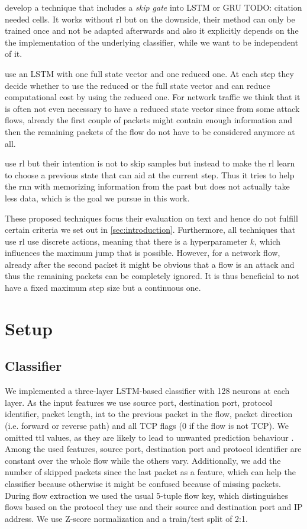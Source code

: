 \documentclass[conference]{IEEEtran}
\newcommand\note[2]{{\color{#1}#2}}
\newcommand\todo[1]{{\note{red}{TODO: #1}}}
\begin{document}
\cite{campos_skip_2018} develop a technique that includes a \textit{skip gate} into LSTM or GRU \todo{citation needed} cells. It works without \gls{rl} but on the downside, their method can only be trained once and not be adapted afterwards and also it explicitly depends on the the implementation of the underlying classifier, while we want to be independent of it. 

\cite{seo_neural_2018} use an LSTM with one full state vector and one reduced one. At each step they decide whether to use the reduced or the full state vector and can reduce computational cost by using the reduced one. For network traffic we think that it is often not even necessary to have a reduced state vector since from some attack flows, already the first couple of packets might contain enough information and then the remaining packets of the flow do not have to be considered anymore at all. 

\cite{gui_long_2018} use \gls{rl} but their intention is not to skip samples but instead to make the \gls{rl} learn to choose a previous state that can aid at the current step. Thus it tries to help the \gls{rnn} with memorizing information from the past but does not actually take less data, which is the goal we pursue in this work. 

These proposed techniques focus their evaluation on text and hence do not fulfill certain criteria we set out in \autoref{sec:introduction}. Furthermore, all techniques that use \gls{rl} use discrete actions, meaning that there is a hyperparameter $k$, which influences the maximum jump that is possible. However, for a network flow, already after the second packet it might be obvious that a flow is an attack and thus the remaining packets can be completely ignored. It is thus beneficial to not have a fixed maximum step size but a continuous one. 

\section{Setup}
\subsection{Classifier}
\label{classifier}
We implemented a three-layer LSTM-based classifier with 128 neurons at each layer. As the input features we use source port, destination port, protocol identifier, packet length, \gls{iat} to the previous packet in the flow, packet direction (i.e. forward or reverse path) and all TCP flags (0 if the flow is not TCP).
We omitted \gls{ttl} values, as they are likely to lead to unwanted prediction behaviour \cite{bachl_walling_2019}.  Among the used features, source port, destination port and protocol identifier are constant over the whole flow while the others vary.
Additionally, we add the number of skipped packets since the last packet as a feature, which can help the classifier because otherwise it might be confused because of missing packets. 
During flow extraction we used the usual 5-tuple flow key, which distinguishes flows based on the protocol they use and their source and destination port and IP address.
We use Z-score normalization and a train/test split of 2:1.
\end{document}
